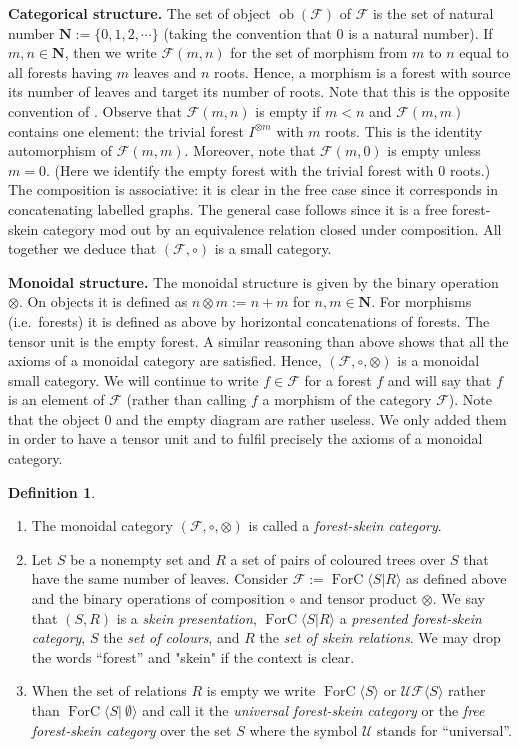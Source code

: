 \documentclass[a4paper, 12pt]{amsart}
\numberwithin{equation}{section}
\theoremstyle{definition}
\newtheorem{definition}[theorem]{Definition}
\newcommand{\cF}{\mathcal F}
\DeclareMathOperator{\FC}{ForC}
\newcommand{\la}{\langle}
\newcommand{\N}{\mathbf{N}}
\DeclareMathOperator{\ob}{ob}
\newcommand{\ot}{\otimes}
\newcommand{\ra}{\rangle}
\newcommand{\cU}{\mathcal U}
\newcommand{\cUF}{\mathcal{UF}}
\begin{document}
{\bf Categorical structure.}
The set of object $\ob(\cF)$ of $\cF$ is the set of natural number $\N:=\{0,1,2,\cdots\}$ (taking the convention that $0$ is a natural number). 
If $m,n\in\N$, then we write $\cF(m,n)$ for the set of morphism from $m$ to $n$ equal to all forests having $m$ leaves and $n$ roots.
Hence, a morphism is a forest with source its number of leaves and target its number of roots.
Note that this is the opposite convention of \cite{Brothier21}. 
Observe that $\cF(m,n)$ is empty if $m<n$ and $\cF(m,m)$ contains one element: the trivial forest $I^{\ot m}$ with $m$ roots. 
This is the identity automorphism of $\cF(m,m)$.
Moreover, note that $\cF(m,0)$ is empty unless $m=0$. (Here we identify the empty forest with the trivial forest with $0$ roots.)
The composition is associative: it is clear in the free case since it corresponds in concatenating labelled graphs. The general case follows since it is a free forest-skein category mod out by an equivalence relation closed under composition.
All together we deduce that $(\cF,\circ)$ is a small category.

{\bf Monoidal structure.}
The monoidal structure is given by the binary operation $\ot.$
On objects it is defined as $n\ot m:=n+m$ for $n,m\in\N.$
For morphisms (i.e.~forests) it is defined as above by horizontal concatenations of forests.
The tensor unit is the empty forest. 
A similar reasoning than above shows that all the axioms of a monoidal category are satisfied.
Hence, $(\cF,\circ,\ot)$ is a monoidal small category.
%
We will continue to write $f\in\cF$ for a forest $f$ and will say that $f$ is an element of $\cF$ (rather than calling $f$ a morphism of the category $\cF$). 
%
Note that the object $0$ and the empty diagram are rather useless. We only added them in order to have a tensor unit and to fulfil precisely the axioms of a monoidal category.

\begin{definition}
\begin{enumerate}
\item The monoidal category $(\cF,\circ,\ot)$ is called a \textit{forest-skein category}.
\item Let $S$ be a nonempty set and $R$ a set of pairs of coloured trees over $S$ that have the same number of leaves.
Consider $\cF:=\FC\langle S| R\rangle$ as defined above and the binary operations of composition $\circ$ and tensor product $\ot$.
We say that $(S,R)$ is a {\it skein presentation}, $\FC\langle S| R\rangle$ a {\it presented forest-skein category}, $S$ the {\it set of colours}, and $R$ the {\it set of skein relations}.
We may drop the words ``forest'' and "skein" if the context is clear.
\item When the set of relations $R$ is empty we write $\FC\langle S\rangle$ or $\cUF\la S\ra$ rather than $\FC\langle S| \ \emptyset \rangle$ and call it the \textit{universal forest-skein category} or the \textit{free forest-skein category} over the set $S$ where the symbol $\cU$ stands for ``universal''.
\end{enumerate}
\end{definition}
\end{document}
